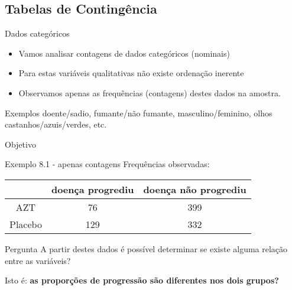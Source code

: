 \documentclass{beamer}
\begin{document}
\subsection{Tabelas de Contingência}

\begin{frame}{Dados categóricos}
  \begin{itemize}
  \item Vamos analisar contagens de dados categóricos (nominais)
  \item Para estas variáveis qualitativas não existe ordenação inerente
  \item Observamos apenas as frequências (contagens) destes dados na amostra.
  \end{itemize}
  \begin{exampleblock}{Exemplos}
    doente/sadio, fumante/não fumante, masculino/feminino, olhos
    castanhos/azuis/verdes, etc.
  \end{exampleblock}
\end{frame}


\begin{frame}{Objetivo}
  \begin{exampleblock}{Exemplo 8.1 - apenas contagens}
    Frequências observadas:
    \begin{tabular}{c|c|c}
      & doença progrediu & doença não progrediu\\
      \hline
      AZT & 76 & 399 \\
      \hline
      Placebo & 129 & 332 \\
    \end{tabular}
  \end{exampleblock}
  \begin{block}{Pergunta}
    A partir destes dados é possível determinar se existe alguma relação entre as variáveis?

    Isto é: {\bf as proporções de progressão são diferentes nos dois grupos?}
  \end{block}
\end{frame}
\end{document}
